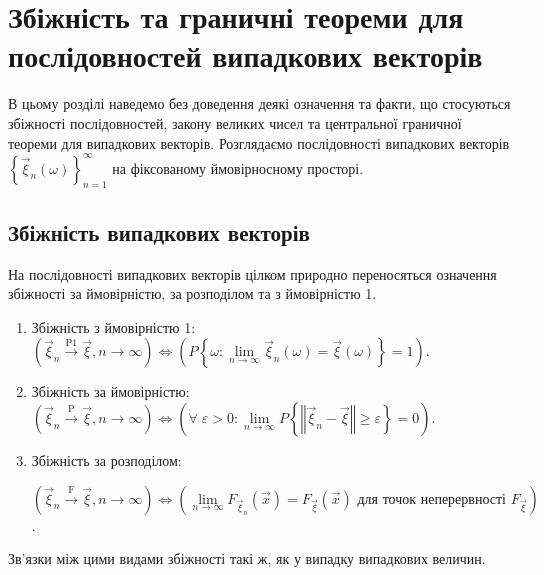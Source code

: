 \section{Збіжність та граничні теореми для послідовностей випадкових векторів}
В цьому розділі наведемо без доведення деякі означення та факти, що стосуються збіжності
послідовностей, закону великих чисел та центральної граничної теореми для випадкових векторів.
Розглядаємо послідовності випадкових векторів $\left\{ \vec{\xi}_n (\omega)\right\}_{n=1}^{\infty}$ на фіксованому
ймовірносному просторі.
\subsection{Збіжність випадкових векторів}
На послідовності випадкових векторів цілком природно переносяться означення збіжності за ймовірністю, за розподілом та з ймовірністю 1.
\begin{enumerate}
    \item Збіжність з ймовірністю 1: $\left(\vec{\xi}_n \overset{\mathrm{P1}}{\longrightarrow} \vec{\xi}, n \to \infty\right) \Leftrightarrow 
    \left(P\left\{ \omega: \underset{n\to\infty}{\lim} \vec{\xi}_n(\omega) = \vec{\xi}(\omega)\right\} = 1\right)$.
    \item Збіжність за ймовірністю: $\left(\vec{\xi}_n \overset{\mathrm{P}}{\longrightarrow} \vec{\xi}, n \to\infty\right) \Leftrightarrow
    \left(\forall \; \varepsilon > 0: \underset{n \to \infty}{\lim} P\left\{\left\Vert\vec{\xi}_n - \vec{\xi}\right\Vert \geq \varepsilon\right\}= 0\right)$.
    \item Збіжність за розподілом: 
    
    $\left(\vec{\xi}_n \overset{\mathrm{F}}{\longrightarrow} \vec{\xi}, n \to\infty\right) \Leftrightarrow
    \left(\underset{n\to\infty}{\lim}F_{\vec{\xi}_n}(\vec{x}) = F_{\vec{\xi}}(\vec{x}) \text{ для точок неперервності } F_{\vec{\xi}}\right)$.
\end{enumerate}
Зв'язки між цими видами збіжності такі ж, як у випадку випадкових величин.

